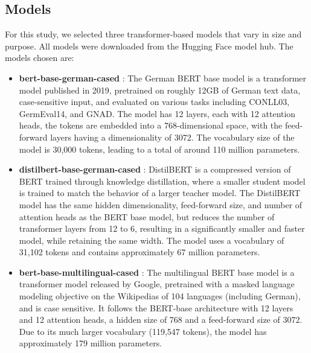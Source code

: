 \documentclass[11pt,a4paper,twocolumn]{article}
\begin{document}
\subsection{Models}
For this study, we selected three transformer-based models that vary in size and purpose. All models were downloaded from the Hugging Face model hub. The models chosen are:
\begin{itemize}
    \item \textbf{bert-base-german-cased} \cite{bert_base_german_cased}: The German BERT base model is a transformer model published in 2019, pretrained on roughly 12GB of German text data, case-sensitive input, and evaluated on various tasks including CONLL03, GermEval14, and GNAD. The model has 12 layers, each with 12 attention heads, the tokens are embedded into a 768-dimensional space, with the feed-forward layers having a dimensionality of 3072. The vocabulary size of the model is 30,000 tokens, leading to a total of around 110 million parameters.
    \item \textbf{distilbert-base-german-cased} \cite{distilbert_base_german_cased}: DistilBERT is a compressed version of BERT trained through knowledge distillation, where a smaller student model is trained to match the behavior of a larger teacher model. The DistilBERT model has the same hidden dimensionality, feed-forward size, and number of attention heads as the BERT base model, but reduces the number of transformer layers from 12 to 6, resulting in a significantly smaller and faster model, while retaining the same width. The model uses a vocabulary of 31,102 tokens and contains approximately 67 million parameters.
    \item \textbf{bert-base-multilingual-cased} \cite{bert_base_multilingual_cased}: The multilingual BERT base model is a transformer model released by Google, pretrained with a masked language modeling objective on the Wikipedias of 104 languages (including German), and is case sensitive. It follows the BERT-base architecture with 12 layers and 12 attention heads, a hidden size of 768 and a feed-forward size of 3072. Due to its much larger vocabulary (119{,}547 tokens), the model has approximately 179 million parameters.
\end{itemize}
\end{document}
